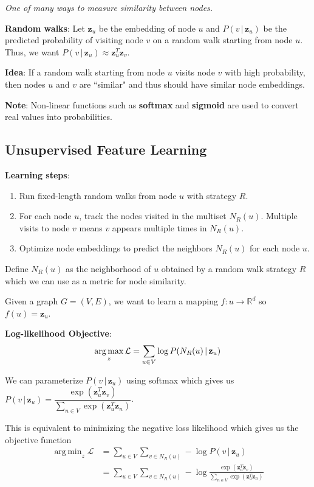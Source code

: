 \documentclass[12pt]{article}
\DeclareMathOperator*{\argmax}{arg\,max}
\DeclareMathOperator*{\argmin}{arg\,min}
\begin{document}
\textit{One of many ways to measure similarity between nodes.}

\medskip
\textbf{Random walks}: Let $\mathbf{z}_u$ be the embedding of node $u$ and
$P(v\,|\,\mathbf{z}_u)$ be the predicted probability of visiting node $v$ on a
random walk starting from node $u$. Thus, we want $P(v\,|\,\mathbf{z}_u)
\approx \mathbf{z}_u^T \mathbf{z}_v$.

\medskip
\textbf{Idea}: If a random walk starting from node $u$ visits node $v$ with high
probability, then nodes $u$ and $v$ are ``similar" and thus should have similar
node embeddings.

\medskip
\textbf{Note}: Non-linear functions such as \textbf{softmax} and
\textbf{sigmoid} are used to convert real values into probabilities.

\subsection*{Unsupervised Feature Learning}

\textbf{Learning steps}:
\begin{enumerate}
  \item Run fixed-length random walks from node $u$ with strategy $R$.
  \item For each node $u$, track the nodes visited in the multiset $N_R(u)$.
    Multiple visits to node $v$ means $v$ appears multiple times in $N_R(u)$.
  \item Optimize node embeddings to predict the neighbors $N_R(u)$ for each node
    $u$.
\end{enumerate}

Define $N_R(u)$ as the neighborhood of $u$ obtained by a random walk strategy
$R$ which we can use as a metric for node similarity.

Given a graph $G=(V, E)$, we want to learn a mapping $f: u \rightarrow
\mathbb{R}^d$ so $f(u) = \mathbf{z}_u$.

\smallskip
\textbf{Log-likelihood Objective}:
\[
  \argmax_z \mathcal{L} = \sum_{u \in V} \log P(N_R(u)\,|\,\mathbf{z}_u) \\
\]

We can parameterize $P(v\,|\,\mathbf{z}_u)$ using softmax which gives us
$P(v\,|\,\mathbf{z}_u) = \dfrac{\exp(\mathbf{z}_u^T\mathbf{z}_v)}{\sum_{n \in V}
\exp(\mathbf{z}_u^T \mathbf{z}_n)}$.

\smallskip
This is equivalent to minimizing the negative loss likelihood which gives us the
objective function
\begin{align*}
  \argmin_z \mathcal{L} &= \sum_{u \in V} \sum_{v \in N_R(u)} -\log
  P(v\,|\,\mathbf{z}_u) \\
  &= \sum_{u \in V} \sum_{v \in N_R(u)} -\log \frac{\exp(\mathbf{z}_u^T
  \mathbf{z}_v)}{\sum_{n \in V} \exp(\mathbf{z}_u^T \mathbf{z}_n)}
\end{align*}
\end{document}
